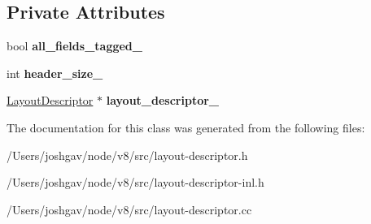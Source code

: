 \subsection*{Private Attributes}
\begin{DoxyCompactItemize}
\item 
bool {\bfseries all\+\_\+fields\+\_\+tagged\+\_\+}\hypertarget{classv8_1_1internal_1_1_layout_descriptor_helper_a6247825391865d7bf20015ac951b8178}{}\label{classv8_1_1internal_1_1_layout_descriptor_helper_a6247825391865d7bf20015ac951b8178}

\item 
int {\bfseries header\+\_\+size\+\_\+}\hypertarget{classv8_1_1internal_1_1_layout_descriptor_helper_a951d76b6264339ba47496c22961f2c9b}{}\label{classv8_1_1internal_1_1_layout_descriptor_helper_a951d76b6264339ba47496c22961f2c9b}

\item 
\hyperlink{classv8_1_1internal_1_1_layout_descriptor}{Layout\+Descriptor} $\ast$ {\bfseries layout\+\_\+descriptor\+\_\+}\hypertarget{classv8_1_1internal_1_1_layout_descriptor_helper_a8c339125126dd4336d2ea427aa500d8d}{}\label{classv8_1_1internal_1_1_layout_descriptor_helper_a8c339125126dd4336d2ea427aa500d8d}

\end{DoxyCompactItemize}


The documentation for this class was generated from the following files\+:\begin{DoxyCompactItemize}
\item 
/\+Users/joshgav/node/v8/src/layout-\/descriptor.\+h\item 
/\+Users/joshgav/node/v8/src/layout-\/descriptor-\/inl.\+h\item 
/\+Users/joshgav/node/v8/src/layout-\/descriptor.\+cc\end{DoxyCompactItemize}
